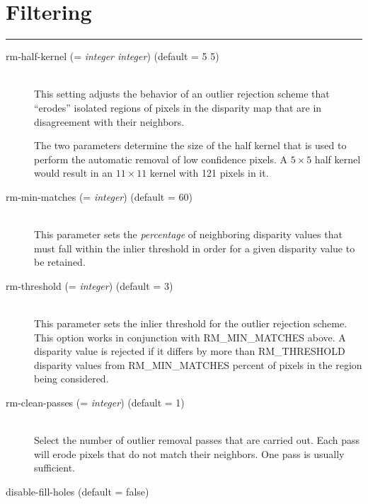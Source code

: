 \section{Filtering}
\hrule
\bigskip

\begin{description}

\item[rm-half-kernel \textnormal{\small{(= \emph{integer integer})}} (default = 5 5)] \hfill \\
  This setting adjusts the behavior of an outlier rejection scheme
  that ``erodes'' isolated regions of pixels in the disparity map that
  are in disagreement with their neighbors.

  The two parameters determine the size of the half kernel that is
  used to perform the automatic removal of low confidence pixels.  A
  $5 \times 5$ half kernel would result in an $11 \times 11$ kernel
  with 121 pixels in it.

\item[rm-min-matches \textnormal{\small{(= \emph{integer})}} (default = 60)] \hfill \\
  This parameter sets the {\em percentage} of neighboring disparity
  values that must fall within the inlier threshold in order for a
  given disparity value to be retained.

\item[rm-threshold \textnormal{\small{(= \emph{integer})}} (default = 3)] \hfill \\
  This parameter sets the inlier threshold for the outlier rejection
  scheme.  This option works in conjunction with RM\_MIN\_MATCHES
  above.  A disparity value is rejected if it differs by more than
  RM\_THRESHOLD disparity values from RM\_MIN\_MATCHES percent of
  pixels in the region being considered.

\item[rm-clean-passes \textnormal{\small{(= \emph{integer})}} (default = 1)] \hfill \\
  Select the number of outlier removal passes that are carried out.
  Each pass will erode pixels that do not match their neighbors.  One
  pass is usually sufficient.

%
\item[disable-fill-holes (default = false)] \hfill \\


\end{description}
